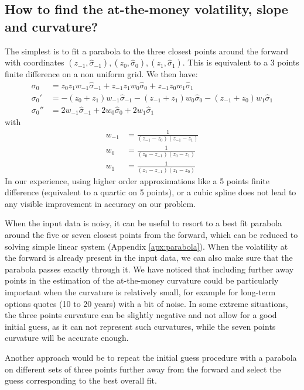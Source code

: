 \documentclass[]{rAMF2e}
\begin{document}
\subsection{How to find the at-the-money volatility, slope and curvature?}
The simplest is to fit a parabola to the three closest points around the forward with coordinates $(z_{-1}, \hat{\sigma}_{-1}), (z_0,\hat{\sigma}_0), (z_{1},\hat{\sigma}_1)$. This is equivalent to a 3 points finite difference on a non uniform grid. We then have:
\begin{align}
\sigma_0 &= z_0 z_1 w_{-1} \hat{\sigma}_{-1} + z_{-1} z_1 w_{0} \hat{\sigma}_{0} +  z_{-1} z_0w_{1} \hat{\sigma}_{1}\\
\sigma_0' &= -(z_0 + z_1) w_{-1} \hat{\sigma}_{-1} - (z_{-1}+ z_1) w_{0} \hat{\sigma}_{0} -  (z_{-1}+ z_0)w_{1} \hat{\sigma}_{1}\\
\sigma_0'' &= 2 w_{-1} \hat{\sigma}_{-1} +2 w_{0} \hat{\sigma}_{0} + 2w_{1} \hat{\sigma}_{1}
\end{align}
with 
\begin{align}
w_{-1} &= \frac{1}{(z_{-1}-z_{0})(z_{-1}-z_{1})}\\
w_{0} &= \frac{1}{(z_{0}-z_{-1})(z_{0}-z_{1})}\\
w_{1} &= \frac{1}{(z_{1}-z_{-1})(z_{1}-z_{0})}
\end{align}
In our experience, using higher order approximations like a 5 points finite difference (equivalent to a quartic on 5 points), or a cubic spline does not lead to any visible improvement in accuracy on our problem.
 
When the input data is noisy, it can be useful to resort to a best fit parabola around the five or seven closest points from the forward, which can be reduced to solving simple linear system (Appendix \ref{apx:parabola}). When the volatility at the forward is already present in the input data, we can also make sure that the parabola passes exactly through it. We have noticed that including further away points in the estimation of the at-the-money curvature could be particularly important when the curvature is relatively small, for example for long-term options quotes (10 to 20 years) with a bit of noise. In some extreme situations, the three points curvature can be slightly negative and not allow for a good initial guess, as it can not represent such curvatures, while the seven points curvature will be accurate enough.

Another approach would be to repeat the initial guess procedure with a parabola on different sets of three points further away from the forward and select the guess corresponding to the best overall fit.
\end{document}
